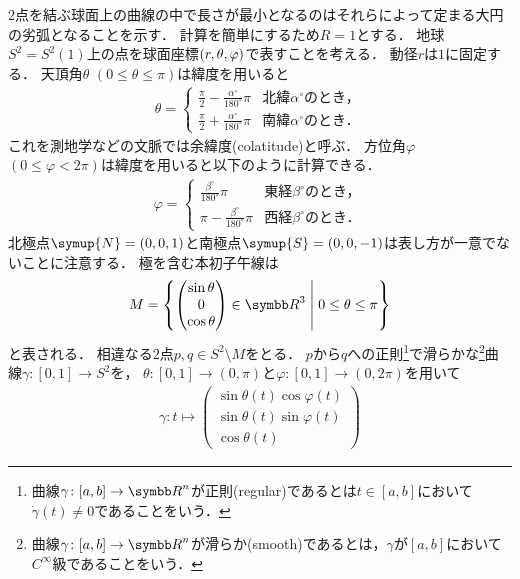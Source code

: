 \documentclass{ltjsbook}
\begin{document}
\(2\)点を結ぶ球面上の曲線の中で長さが最小となるのはそれらによって定まる大円の劣弧となることを示す．
計算を簡単にするため\(R = 1\)とする．
地球\(S^2 = S^2(1)\)上の点を球面座標\((r, \theta, \varphi)\)で表すことを考える．
動径\(r\)は\(1\)に固定する．
天頂角\(\theta\) \((0 \leq \theta \leq \pi)\)は緯度を用いると
\begin{align*}
    \theta = \begin{cases}
        \displaystyle
        \frac{\pi}{2} - \frac{\alpha^\circ}{180^\circ} \pi
        & \text{北緯\(\alpha^\circ\)のとき，} \\[10pt]
        \displaystyle
        \frac{\pi}{2} + \frac{\alpha^\circ}{180^\circ} \pi
        & \text{南緯\(\alpha^\circ\)のとき．}
    \end{cases}
\end{align*}
これを測地学などの文脈では余緯度(colatitude)と呼ぶ．
方位角\(\varphi\) \((0 \leq \varphi < 2\pi)\)は緯度を用いると以下のように計算できる．
\begin{align*}
    \varphi = \begin{cases}
        \displaystyle
        \frac{\beta^\circ}{180^\circ} \pi
        & \text{東経\(\beta^\circ\)のとき，} \\[10pt]
        \displaystyle
        \pi - \frac{\beta^\circ}{180^\circ} \pi
        & \text{西経\(\beta^\circ\)のとき．}
    \end{cases}
\end{align*}
北極点\(\symup{N} = (0, 0, 1)\)と南極点\(\symup{S} = (0, 0, -1)\)は表し方が一意でないことに注意する．
極を含む本初子午線は
\begin{align*}
    M = \left\{\begin{pmatrix} \sin \theta \\ 0 \\ \cos \theta \end{pmatrix} \in {\Real}^3 \relmiddle{|} 0 \leq \theta \leq \pi\right\}
\end{align*}
と表される．
相違なる\(2\)点\(p, q \in S^2 \setminus M\)をとる．
\(p\)から\(q\)への正則\footnote{%
曲線\(\gamma\colon [a, b] \to {\Real}^n\)が正則(regular)であるとは\(t \in [a, b]\)において\(\dot{\gamma}(t) \neq 0\)であることをいう．
}で滑らかな\footnote{%
曲線\(\gamma\colon [a, b] \to {\Real}^n\)が滑らか(smooth)であるとは，\(\gamma\)が\([a, b]\)において\(C^\infty\)級であることをいう．
}曲線\(\gamma \colon [0, 1] \to S^2\)を，
\(\theta \colon [0, 1] \to (0, \pi)\)と\(\varphi\colon [0, 1] \to (0, 2\pi)\)を用いて
\begin{align*}
    \gamma \colon t \mapsto
        \begin{pmatrix}
            \sin \theta(t) \cos \varphi(t) \\
            \sin \theta(t) \sin \varphi(t) \\
            \cos \theta(t)
        \end{pmatrix}
\end{align*}
\end{document}
